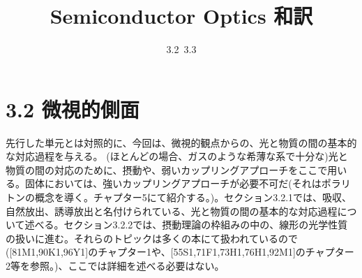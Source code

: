 \documentclass[11pt,a4j,uplatex]{jsarticle}
\title{Semiconductor Optics 和訳}
\author{3.2~3.3}
\begin{document}
\maketitle %

\thispagestyle{empty}%
\clearpage
\addtocounter{page}{-1}

\newpage

\tableofcontents %

\thispagestyle{empty}%
\clearpage
\addtocounter{page}{-1}


\newpage
\section{3.2 微視的側面}
先行した単元とは対照的に、今回は、微視的観点からの、光と物質の間の基本的な対応過程を与える。
(ほとんどの場合、ガスのような希薄な系で十分な)光と物質の間の対応のために、摂動や、弱いカップリングアプローチをここで用いる。固体においては、強いカップリングアプローチが必要不可だ(それはポラリトンの概念を導く。チャプター5にて紹介する。)。セクション3.2.1では、吸収、自然放出、誘導放出と名付けられている、光と物質の間の基本的な対応過程について述べる。セクション3.2.2では、摂動理論の枠組みの中の、線形の光学性質の扱いに進む。それらのトピックは多くの本にて扱われているので([81M1,90K1,96Y1]のチャプター1や、[55S1,71F1,73H1,76H1,92M1]のチャプター2等を参照。)、ここでは詳細を述べる必要はない。
\end{document}
